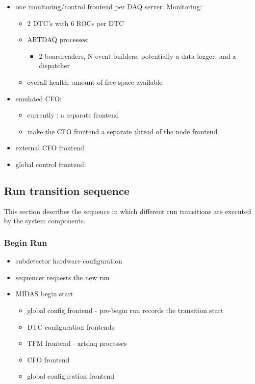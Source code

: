 \begin{itemize}
\item
  one monitoring/control frontend per DAQ server. Monitoring:
  \begin{itemize}
  \item
    2 DTC's with 6 ROCs per DTC
  \item
    ARTDAQ processes:
    \begin{itemize}
    \item
      2 boardreaders, N event builders, potentially a data logger, and a dispatcher
    \end{itemize}
  \item
    overall health: amount of free space available
  \end{itemize}
\item
  emulated CFO:
  \begin{itemize}
  \item
    currently : a separate frontend 
  \item 
    make the CFO frontend a separate thread of the node frontend
  \end{itemize}
\item
  external CFO frontend 
\item
  global control frontend:
\end{itemize}

\subsection{Run transition sequence}

This section describes the sequence in which different run transitions
are executed by the system components.


\subsubsection{Begin Run}
\begin{itemize}
\item
  subdetector hardware configuration
\item
  sequencer requests the new run
\item
  MIDAS begin start
  \begin{itemize}
  \item
    global config frontend - pre-begin run records the transition start
  \item
    DTC configuration frontends 
  \item
    TFM frontend - artdaq processes
  \item
    CFO frontend 
  \item
    global configuration frontend
  \end{itemize}
\end{itemize}

